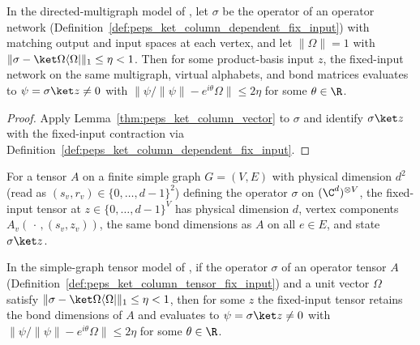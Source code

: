 \begin{lemma}
    \label{thm:peps_ket_column_dependent}
    \leanok
    In the directed-multigraph model of \cite[Lemma~8.1]{OpenAI2026PolynomialPEPS},
    let $\sigma$ be the operator of an operator network (Definition~\ref{def:peps_ket_column_dependent_fix_input}) with matching output and input spaces at each vertex, and let $\lVert\Omega\rVert=1$ with
    $\lVert\sigma-\ket\Omega\langle\Omega|\rVert_1\le\eta<1$. Then for some
    product-basis input $z$, the fixed-input network on the same multigraph, virtual alphabets, and bond matrices evaluates to $\psi=\sigma\ket z\ne0$ with $\lVert\psi/\lVert\psi\rVert-e^{i\theta}\Omega\rVert\le2\eta$ for some $\theta\in\R$.
\end{lemma}

\begin{proof}\leanok
    Apply Lemma~\ref{thm:peps_ket_column_vector} to $\sigma$ and identify $\sigma\ket z$ with the fixed-input contraction via Definition~\ref{def:peps_ket_column_dependent_fix_input}.
\end{proof}

\begin{definition}
    \label{def:peps_ket_column_tensor_fix_input}
    \leanok
    For a tensor $A$ on a finite simple graph $G=(V,E)$ with physical dimension $d^2$ (read as $(s_v,r_v)\in\{0,\dots,d-1\}^2$) defining the operator $\sigma$ on $(\C^d)^{\otimes V}$, the fixed-input tensor at $z\in\{0,\dots,d-1\}^V$ has physical dimension $d$, vertex components $A_v(\,\cdot\,,(s_v,z_v))$, the same bond dimensions as $A$ on all $e\in E$, and state $\sigma\ket z$.
\end{definition}

\begin{lemma}
    \label{thm:peps_ket_column_tensor}
    \leanok
    In the simple-graph tensor model of \cite[Lemma~8.1]{OpenAI2026PolynomialPEPS},
    if the operator $\sigma$ of an operator tensor $A$ (Definition~\ref{def:peps_ket_column_tensor_fix_input}) and a unit vector $\Omega$ satisfy
    $\lVert\sigma-\ket\Omega\langle\Omega|\rVert_1\le\eta<1$, then for some
    $z$ the fixed-input tensor retains the bond dimensions of $A$ and evaluates to $\psi=\sigma\ket z\ne0$ with $\lVert\psi/\lVert\psi\rVert-e^{i\theta}\Omega\rVert\le2\eta$ for some $\theta\in\R$.
\end{lemma}

